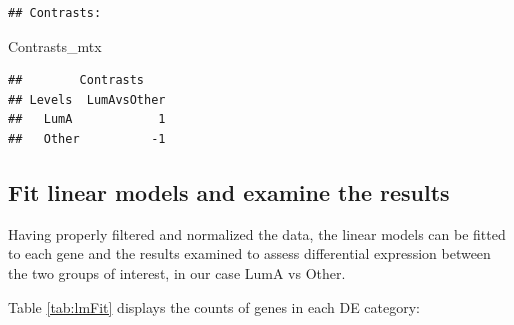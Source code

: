 \documentclass[
]{book}
\newenvironment{Shaded}{\begin{snugshade}}{\end{snugshade}}
\newcommand{\NormalTok}[1]{#1}
\begin{document}
\begin{verbatim}
## Contrasts:
\end{verbatim}

\begin{Shaded}
\begin{Highlighting}[]
\NormalTok{Contrasts\_mtx}
\end{Highlighting}
\end{Shaded}

\begin{verbatim}
##        Contrasts
## Levels  LumAvsOther
##   LumA            1
##   Other          -1
\end{verbatim}

\hypertarget{fit-linear-models-and-examine-the-results-1}{%
\subsection*{Fit linear models and examine the results}\label{fit-linear-models-and-examine-the-results-1}}

Having properly filtered and normalized the data,
the linear models can be fitted to each gene and the results
examined to assess differential expression between the two groups
of interest, in our case LumA vs Other.

Table \ref{tab:lmFit} displays the counts of genes in each DE category:
\end{document}
